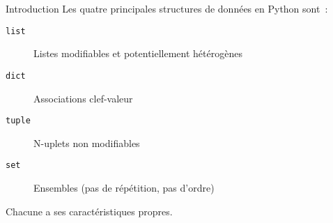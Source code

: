 \begin{frame}{Introduction}
  Les quatre principales structures de données en Python sont~:

  \begin{description}
    \item[\texttt{list}] Listes modifiables et potentiellement hétérogènes
    \item[\texttt{dict}] Associations clef-valeur
    \item[\texttt{tuple}] N-uplets non modifiables
    \item[\texttt{set}] Ensembles (pas de répétition, pas d'ordre)
  \end{description}

  Chacune a ses caractéristiques propres.
\end{frame}
